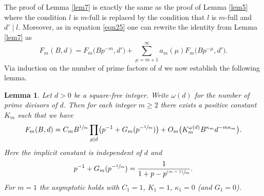 \documentclass[11pt]{article}
\numberwithin{equation}{section}
\newcommand{\psfrac}[2]{\sfrac{(#1)}{#2}}
\let\kap\kappa
\let\ome\omega
\newtheorem{lemma}[theorem]{Lemma}
\theoremstyle{definition}
\numberwithin{theorem}{section}
\begin{document}
The proof of Lemma \ref{lem7} is exactly the same as the proof of Lemma \ref{lem5} where the condition $l$ is $m$-full is replaced by the condition that $l$ is $m$-full and $d'\mid l$. Moreover, as in equation \eqref{eqn25} one can rewrite the identity from Lemma \ref{lem7} as
\begin{equation}\label{eqn27}
F_m(B,d) = F_m\bigl(Bp^{-m},d'\bigr) +\sum_{\mu=m+1}^\infty a_m(\mu) F_m\bigl(Bp^{-\mu},d'\bigr).
\end{equation}
Via induction on the number of prime factors of $d$ we now establish the following lemma.

\begin{lemma}\label{lem8}
Let $d>0$ be a square-free integer. Write $\ome(d)$ for the number of prime divisors of $d$. Then for each integer $m\geq 2$ there exists a positive constant $K_m$ such that we have
\[
F_m(B,d)=C_mB^{\sfrac{1}{m}}\prod_{p\mid d} \bigl(p^{-1}+G_m(p^{-\sfrac{1}{m}})\bigr)+ O_m\bigl(K_m^{\ome(d)}B^{\kap_m}d^{-m\kap_m}\bigr).
\]
Here the implicit constant is independent of $d$ and
\begin{equation}
\label{eq:G_m_explicit}
p^{-1}+G_{m}(p^{-\sfrac{1}{m}})=\frac1{1+p-p^{\psfrac{m-1}m}}.
\end{equation}
For $m=1$ the asymptotic holds with $C_1=1$, $K_1=1$, $\kap_1=0$ (and $G_1=0$).
\end{lemma}
\end{document}
